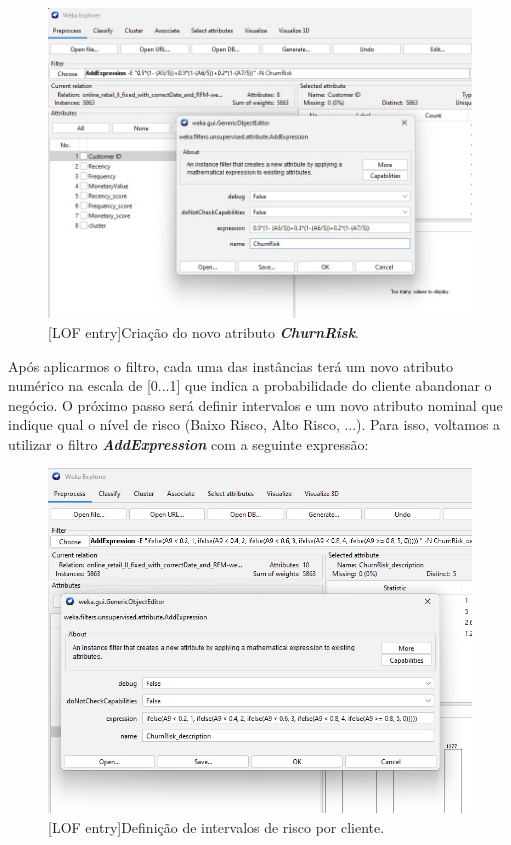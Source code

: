 \documentclass{easychair}
\begin{document}
\begin{figure}[H]
    \begin{centering}
    \includegraphics[width=1\linewidth]{imagens/figure20.jpg}\label{cap-4-fig20}
    [LOF entry]{Criação do novo atributo \textit{\textbf{ChurnRisk}}.}
    \label{fig20}
    \end{centering}
\end{figure}

Após aplicarmos o filtro, cada uma das instâncias terá um novo atributo numérico na escala de [0...1] que indica a probabilidade do cliente abandonar o negócio. O próximo passo será definir intervalos e um novo atributo nominal que indique qual o nível de risco (Baixo Risco, Alto Risco, ...). Para isso, voltamos a utilizar o filtro \textit{\textbf{AddExpression}} com a seguinte expressão:

\begin{figure}[H]
    \begin{centering}
    \includegraphics[width=1\linewidth]{imagens/figure21.jpg}\label{cap-4-fig21}
    [LOF entry]{Definição de intervalos de risco por cliente.}
    \label{fig21}
    \end{centering}
\end{figure}
\end{document}
